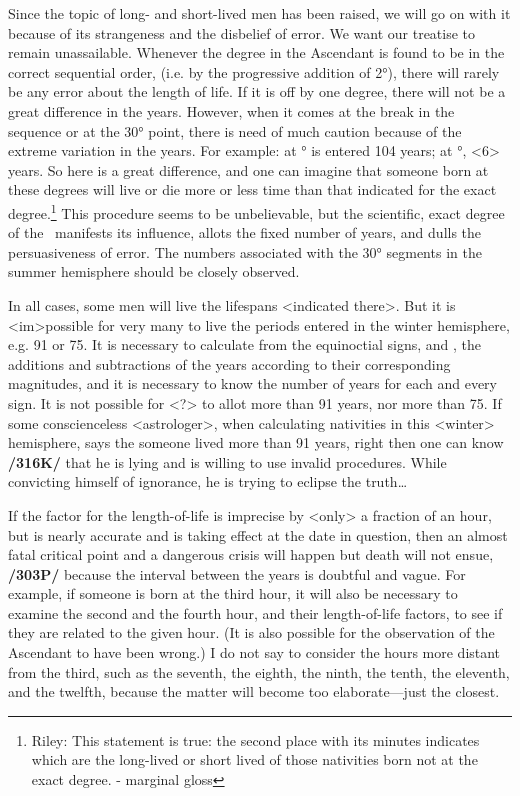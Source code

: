 Since the topic of long- and short-lived men has been raised, we will go on with it because of its strangeness and the disbelief of error. We want our treatise to remain unassailable. Whenever the degree in
the Ascendant is found to be in the correct sequential order, (i.e. by the progressive addition of 2°), there will rarely be any error about the length of life. If it is off by one degree, there will not be a great difference in the years. However, when it comes at the break in the sequence or at the 30° point, there is need of much caution because of the extreme variation in the years. For example: at \Cancer\xspace 27° is entered 104 years; at \Cancer\xspace 28°, <6> years. So here is a great difference, and one can imagine that someone born at
these degrees will live or die more or less time than that indicated for the exact degree.\footnote{Riley: This statement is true: the second place with its minutes indicates which are the long-lived or short lived
of those nativities born not at the exact degree. - marginal gloss} This procedure seems to be unbelievable, but the scientific, exact degree of the \Sun\, manifests its influence, allots the fixed number of years, and dulls the persuasiveness of error. The numbers associated with the 30° segments in the summer hemisphere should be closely observed.

In all cases, some men will live the lifespans <indicated there>. But it is <im>possible for very many to live the periods entered in the winter hemisphere, e.g. 91 or 75. It is necessary to calculate from the equinoctial signs, \Aries\xspace and \Libra, the additions and subtractions of the years according to their corresponding magnitudes, and it is necessary to know the number of years for each and every sign. It is not possible for \Libra\xspace <?> to allot more than 91 years, nor \Capricorn\xspace more than 75. If some conscienceless <astrologer>, when calculating nativities in this <winter> hemisphere, says the someone lived more than
91 years, right then one can know \textbf{/316K/} that he is lying and is willing to use invalid procedures. While convicting himself of ignorance, he is trying to eclipse the truth…

If the factor for the length-of-life is imprecise by <only> a fraction of an hour, but is nearly accurate and is taking effect at the date in question, then an almost fatal critical point and a dangerous crisis will happen but death will not ensue, \textbf{/303P/} because the interval between the years is doubtful and vague. For example, if someone is born at the third hour, it will also be necessary to examine the second and the fourth hour, and their length-of-life factors, to see if they are related to the given hour. (It is also possible
for the observation of the Ascendant to have been wrong.) I do not say to consider the hours more distant from the third, such as the seventh, the eighth, the ninth, the tenth, the eleventh, and the twelfth, because the matter will become too elaborate—just the closest. 

